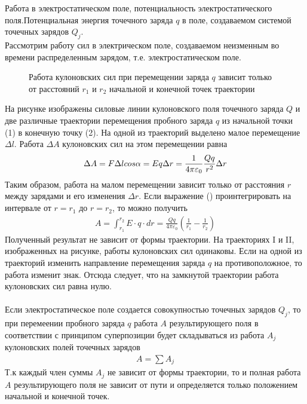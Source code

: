 \documentclass[__main__.tex]{subfiles}
\begin{document}
	
	 Работа в электростатическом поле, потенциальность электростатического поля.Потенциальная энергия точечного заряда $q$ в поле, создаваемом системой точечных зарядов $Q_j$.\\ 
	
	Рассмотрим работу сил в электрическом поле, создаваемом неизменным во времени распределенным зарядом, т.е. электростатическом поле.
	\begin{figure}[h]
		\center{\texttt{[image: c-10-1]}}
		\caption{Работа кулоновских сил при перемещении заряда $q$ зависит только от расстояний $r_1$ и $r_2$ начальной и конечной точек траектории}
	\end{figure}

	На рисунке изображены силовые линии кулоновского поля точечного заряда $Q$ и две различные траектории перемещения пробного заряда $q$ из начальной точки (1) в конечную точку (2). На одной из траекторий выделено малое перемещение $\Delta l$. Работа $\Delta A$ кулоновских сил на этом перемещении равна
	\begin{gather}
		\llabel{c10-1}
		\Delta A = F\Delta l cos\alpha = Eq\Delta r = \frac{1}{4\pi\varepsilon_0}\frac{Qq}{r^2}\Delta r
	\end{gather} 
	Таким образом, работа на малом перемещении зависит только от расстояния $r$ между зарядами и его изменения $\Delta r$. Если выражение () проинтегрировать на интервале от $r=r_1$ до $r=r_2$, то можно получить 
	\begin{gather*}
		A = \int_{r_1}^{r_2}E\cdot q\cdot dr = \frac{Qq}{4\pi\varepsilon_0}\left(\frac{1}{r_1}-\frac{1}{r_2}\right) 
	\end{gather*} 	
	Полученный результат не зависит от формы траектории. На траекториях I и II, изображенных на рисунке, работы кулоновских сил одинаковы. Если на одной из траекторий изменить направление перемещения заряда $q$ на противоположное, то работа изменит знак. Отсюда следует, что на замкнутой траектории работа кулоновских сил равна нулю.\\\\
	Если электростатическое поле создается совокупностью точечных зарядов $Q_j$, то при перемеении пробного заряда $q$ работа $A$ результирующего поля в соответствии с принципом суперпозиции будет складываться из работа $A_j$  кулоновских полей точечных зарядов
	\begin{gather*}
		A = \sum A_j
	\end{gather*} 
	Т.к каждый член суммы $A_j$ не зависит от формы траектории, то и полная работа $A$ результирующего поля не зависит от пути и определяется только положением начальной и конечной точек.
\end{document}
